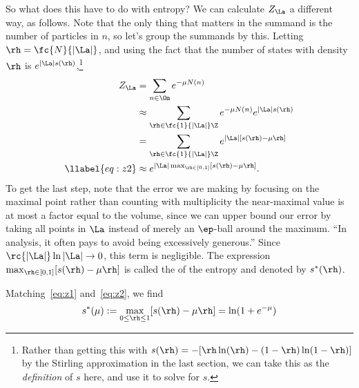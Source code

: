 So what does this have to do with entropy? We can calculate $Z_\La$ a different way, as follows.
Note that the only thing that matters in the summand is the number of particles in $n$, so let's group the summands by this. Letting $\rh=\fc{N}{|\La|}$, and using the fact that the number of states with density $\rh$ is $e^{|\La|s(\rh)}$,\footnote{Rather than getting this with $s(\rh)=-[\rh\ln(\rh) - (1-\rh) \ln (1-\rh)]$ by the Stirling approximation in the last section, we can take this as the \emph{definition} of $s$ here, and use it to solve for $s$.}
\begin{align}
\nonumber
Z_\La&=\sum_{n\in \Om} e^{-\mu N(n)}\\
\nonumber
& \approx \sum_{\rh \in \fc{1}{|\La|}\Z} e^{-\mu N(n)} e^{|\La|s(\rh)}\\
\nonumber
& =\sum_{\rh \in \fc{1}{|\La|}\Z} e^{|\La|[s(\rh)-\mu \rh]}\\
\llabel{eq:z2}
&\approx e^{|\La|\max_{\rh\in [0,1]}[s(\rh)-\mu\rh]}.
\end{align}
To get the last step, note that the error we are making by focusing on the maximal point rather than counting with multiplicity the near-maximal value is at most a factor equal to the volume, since we can upper bound our error by taking all points in $\La$ instead of merely an $\ep$-ball around the maximum. ``In analysis, it often pays to avoid being excessively generous.'' Since $\rc{|\La|}\ln |\La|\to 0$, this term is negligible. %
The expression $\max_{\rh\in [0,1]}[s(\rh)-\mu\rh]$ is called the  of the entropy and denoted by $s^*(\rh)$. 

Matching~\eqref{eq:z1} and~\eqref{eq:z2}, we find
\[
s^*(\mu):= \max_{0\le \rh\le 1} [s(\rh) - \mu\rh] = \ln (1+e^{-\mu})
\]



